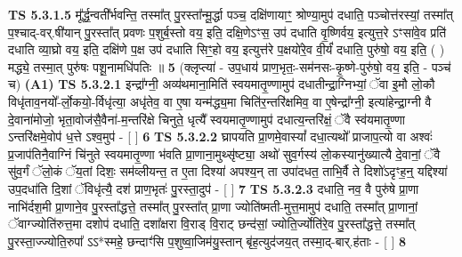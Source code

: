 \documentclass[17pt]{extarticle}
\begin{document}
                                \textbf{ TS 5.3.1.5} \newline
                  मू᳚र्द्ध॒न्वती᳚र्भवन्ति॒ तस्मा᳚त् पु॒रस्ता᳚न्मू॒र्द्धा पञ्च॒ दक्षि॑णायाꣳ॒॒ श्रोण्या॒मुप॑ दधाति॒ पञ्चोत्त॑रस्यां॒ तस्मा᳚त् प॒श्चाद्-वर्.षी॑यान् पु॒रस्ता᳚त् प्रवणः प॒शुर्ब॒स्तो वय॒ इति॒ दक्षि॒णेऽꣳस॒ उप॑ दधाति वृ॒ष्णिर्वय॒ इत्युत्त॒रे ऽꣳसा॑वे॒व प्रति॑ दधाति व्या॒घ्रो वय॒ इति॒ दक्षि॑णे प॒क्ष उप॑ दधाति सिꣳ॒॒हो वय॒ इत्युत्त॑रे प॒क्षयो॑रे॒व वी॒र्यं॑ दधाति॒ पुरु॑षो॒ वय॒ इति॒ ( ) मद्ध्ये॒ तस्मा॒त् पुरु॑षः पशू॒नामधि॑पतिः ॥ \textbf{  5 } \newline
                  \newline
                      (क्लृप्त्या॑ - उप॒धाय॑ प्राण॒भृतः॒-सम॑नसः-कृ॒ष्णे-पुरु॑षो॒ वय॒ इति॒ - पञ्च॑ च)  \textbf{(A1)} \newline \newline
                                        \textbf{ TS 5.3.2.1} \newline
                  इन्द्रा᳚ग्नी॒ अव्य॑थमाना॒मिति॑ स्वयमातृ॒ण्णामुप॑ दधातीन्द्रा॒ग्निभ्यां॒ ॅवा इ॒मौ लो॒कौ विधृ॑ताव॒नयो᳚-र्लो॒कयो॒-र्विधृ॑त्या॒ अधृ॑तेव॒ वा ए॒षा यन्म॑द्ध्य॒मा चिति॑र॒न्तरि॑क्षमिव॒ वा ए॒षेन्द्रा᳚ग्नी॒ इत्या॑हेन्द्रा॒ग्नी वै दे॒वाना॑मोजो॒ भृता॒वोज॑सै॒वैना॑-म॒न्तरि॑क्षे चिनुते॒ धृत्यै᳚ स्वयमातृ॒ण्णामुप॑ दधात्य॒न्तरि॑क्षं॒ ॅवै स्व॑यमातृ॒ण्णा ऽन्तरि॑क्षमे॒वोप॑ ध॒त्ते ऽश्व॒मुप॑ - [  ] \textbf{  6} \newline
                  \newline
                                \textbf{ TS 5.3.2.2} \newline
                  घ्रापयति प्रा॒णमे॒वास्यां᳚ दधा॒त्यथो᳚ प्राजाप॒त्यो वा अश्वः॑ प्र॒जाप॑तिनै॒वाग्निं चि॑नुते स्वयमातृ॒ण्णा भ॑वति प्रा॒णाना॒मुथ्सृ॑ष्ट्या॒ अथो॑ सुव॒र्गस्य॑ लो॒कस्यानु॑ख्यात्यै दे॒वानां॒ ॅवै सु॑व॒र्गं ॅलो॒कं ॅय॒तां दिशः॒ सम॑व्लीयन्त॒ त ए॒ता दिश्या॑ अपश्य॒न् ता उपा॑दधत॒ ताभि॒र्वै ते दिशो॑ऽदृꣳह॒न्॒ यद्दिश्या॑ उप॒दधा॑ति दि॒शां ॅविधृ॑त्यै॒ दश॑ प्राण॒भृतः॑ पु॒रस्ता॒दुप॑ - [  ] \textbf{  7} \newline
                  \newline
                                \textbf{ TS 5.3.2.3} \newline
                  दधाति॒ नव॒ वै पुरु॑षे प्रा॒णा नाभि॑र्दश॒मी प्रा॒णाने॒व पु॒रस्ता᳚द्धत्ते॒ तस्मा᳚त् पु॒रस्ता᳚त् प्रा॒णा ज्योति॑ष्मती-मुत्त॒मामुप॑ दधाति॒ तस्मा᳚त् प्रा॒णानां॒ ॅवाग्ज्योति॑रुत्त॒मा दशोप॑ दधाति॒ दशा᳚क्षरा वि॒राड् वि॒राट् छन्द॑सां॒ ज्योति॒र्ज्योति॑रे॒व पु॒रस्ता᳚द्धत्ते॒ तस्मा᳚त् पु॒रस्ता॒ज्ज्योति॒रुपा᳚ ऽऽ*स्महे॒ छन्दाꣳ॑सि प॒शुष्वा॒जिम॑यु॒स्तान् बृ॑ह॒त्युद॑जय॒त् तस्मा॒द्-बार्.ह॑ताः - [  ] \textbf{  8} \newline
\end{document}
